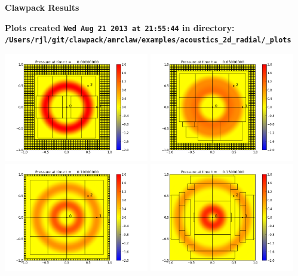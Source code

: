 \documentclass[11pt]{article}
\begin{document}
        \begin{center}{\Large\bf Clawpack Results}\vskip 5pt
        
        \bf Plots created {\tt Wed Aug 21 2013 at 21:55:44} in directory: \vskip 5pt
        \verb+/Users/rjl/git/clawpack/amrclaw/examples/acoustics_2d_radial/_plots+
        \end{center}
        \vskip 5pt
        \includegraphics[width=0.475\textwidth]{frame0000fig0.png}
\vskip 10pt 
\includegraphics[width=0.475\textwidth]{frame0001fig0.png}
\vskip 10pt 
\includegraphics[width=0.475\textwidth]{frame0002fig0.png}
\vskip 10pt 
\includegraphics[width=0.475\textwidth]{frame0003fig0.png}
\end{document}
